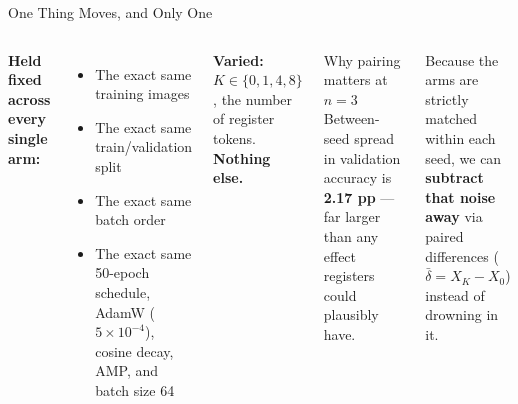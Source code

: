 \documentclass[aspectratio=169]{beamer}
\begin{document}
\begin{frame}{One Thing Moves, and Only One}
\small
\begin{columns}[T]
\textbf{Held fixed across every single arm:}
\begin{itemize}\itemsep=2pt
\item The exact same training images
\item The exact same train/validation split
\item The exact same batch order
\item The exact same 50-epoch schedule, AdamW ($5 \times 10^{-4}$), cosine decay, AMP, and batch size 64
\end{itemize}

\medskip
\textbf{Varied:} $K \in \{0, 1, 4, 8\}$, the number of register tokens. \textbf{Nothing else.}

\begin{block}{Why pairing matters at $n = 3$}
Between-seed spread in validation accuracy is \textbf{2.17 pp} --- far larger than any effect registers could plausibly have.
\end{block}

\smallskip
Because the arms are strictly matched within each seed, we can \textbf{subtract that noise away} via paired differences ($\bar{\delta} = X_K - X_0$) instead of drowning in it.
\end{columns}
\end{frame}
\end{document}
